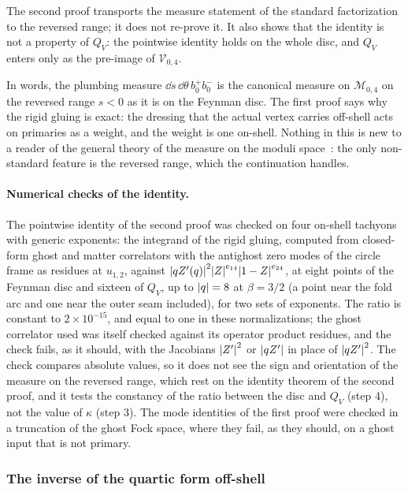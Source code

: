 The second proof transports the measure statement of the standard factorization to the reversed range; it does not re-prove it.
It also shows that the identity is not a property of $Q_V$: the pointwise identity holds on the whole disc, and $Q_V$ enters only as the pre-image of $\mathcal V_{0,4}$.

In words, the plumbing measure $\dd s \, \dd\theta \, b_0^+ b_0^-$ is the canonical measure on $\mathcal M_{0,4}$ on the reversed range $s < 0$ as it is on the Feynman disc.
The first proof says why the rigid gluing is exact: the dressing that the actual vertex carries off-shell acts on primaries as a weight, and the weight is one on-shell.
Nothing in this is new to a reader of the general theory of the measure on the moduli space~\cite{Zwiebach:1993:ClosedStringField}: the only non-standard feature is the reversed range, which the continuation handles.

\paragraph{Numerical checks of the identity.}
The pointwise identity of the second proof was checked on four on-shell tachyons with generic exponents: the integrand of the rigid gluing, computed from closed-form ghost and matter correlators with the antighost zero modes of the circle frame as residues at $u_{1,2}$, against ${|q Z'(q)|}^2 {|Z|}^{e_{14}} {|1 - Z|}^{e_{24}}$, at eight points of the Feynman disc and sixteen of $Q_V$, up to ${|q|} = 8$ at $\beta = 3 / 2$ (a point near the fold arc and one near the outer seam included), for two sets of exponents.
The ratio is constant to $2 \times 10^{-15}$, and equal to one in these normalizations; the ghost correlator used was itself checked against its operator product residues, and the check fails, as it should, with the Jacobians ${|Z'|}^2$ or ${|q Z'|}$ in place of ${|q Z'|}^2$.
The check compares absolute values, so it does not see the sign and orientation of the measure on the reversed range, which rest on the identity theorem of the second proof, and it tests the constancy of the ratio between the disc and $Q_V$ (step 4), not the value of $\kappa$ (step 3).
The mode identities of the first proof were checked in a truncation of the ghost Fock space, where they fail, as they should, on a ghost input that is not primary.

\subsubsection{The inverse of the quartic form off-shell}
\label{sec:wscircle:inverse}

